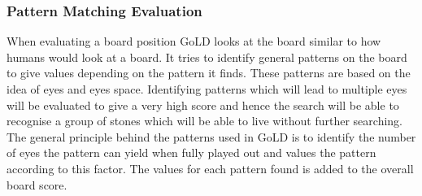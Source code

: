 \documentclass{l4proj}
\begin{document}
\subsubsection{Pattern Matching Evaluation}

When evaluating a board position GoLD looks at the board similar to how humans would look at a board. It tries to identify general patterns on the board to give values depending on the pattern it finds. These patterns are based on the idea of eyes and eyes space. Identifying patterns which will lead to multiple eyes will be evaluated to give a very high score and hence the search will be able to recognise a group of stones which will be able to live without further searching. The general principle behind the patterns used in GoLD is to identify the number of eyes the pattern can yield when fully played out and values the pattern according to this factor. The values for each pattern found is added to the overall board score.
\end{document}
